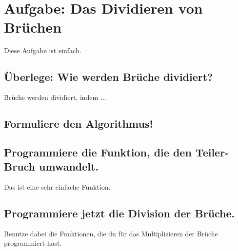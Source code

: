 \section{Aufgabe: Das Dividieren von Brüchen}

Diese Aufgabe ist einfach.

\subsection{Überlege: Wie werden Brüche dividiert?}

Brüche werden dividiert, indem $\dots$

\subsection{Formuliere den Algorithmus!}

\subsection{Programmiere die Funktion, die den Teiler-Bruch umwandelt.}

Das ist eine sehr einfache Funktion.

\subsection{Programmiere jetzt die Division der Brüche.}

Benutze dabei die Funktionen, die du für das Multiplizieren der Brüche programmiert hast.